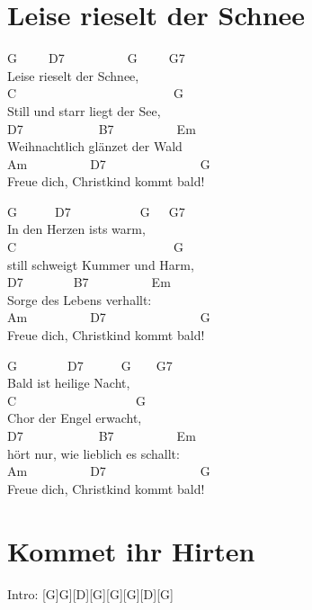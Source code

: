 \documentclass[
  letterpaper,
  a5paper]{memoir}
\begin{document}
\hypertarget{leise-rieselt-der-schnee}{%
\chapter{Leise rieselt der Schnee}\label{leise-rieselt-der-schnee}}

G~~~~~D7~~~~~~~~~~G~~~~~G7\\
Leise rieselt der Schnee,\\
C~~~~~~~~~~~~~~~~~~~~~~~~~G\\
Still und starr liegt der See,\\
D7~~~~~~~~~~~~B7~~~~~~~~~~Em\\
Weihnachtlich glänzet der Wald\\
Am~~~~~~~~~~D7~~~~~~~~~~~~~~~G\\
Freue dich, Christkind kommt bald!

G~~~~~~D7~~~~~~~~~~~G~~~G7\\
In den Herzen ist\textquotesingle s warm,\\
C~~~~~~~~~~~~~~~~~~~~~~~~~G\\
still schweigt Kummer und Harm,\\
D7~~~~~~~~B7~~~~~~~~~~Em\\
Sorge des Lebens verhallt:\\
Am~~~~~~~~~~D7~~~~~~~~~~~~~~~G\\
Freue dich, Christkind kommt bald!

G~~~~~~~~D7~~~~~~G~~~~G7\\
Bald ist heilige Nacht,\\
C~~~~~~~~~~~~~~~~~~~G\\
Chor der Engel erwacht,\\
D7~~~~~~~~~~~~B7~~~~~~~~~~Em\\
hört nur, wie lieblich es schallt:\\
Am~~~~~~~~~~D7~~~~~~~~~~~~~~~G\\
Freue dich, Christkind kommt bald!

\hypertarget{kommet-ihr-hirten}{%
\chapter{Kommet ihr Hirten}\label{kommet-ihr-hirten}}

Intro: {[}G{]}G{]}{[}D{]}{[}G{]}{[}G{]}{[}G{]}{[}D{]}{[}G{]}
\end{document}
